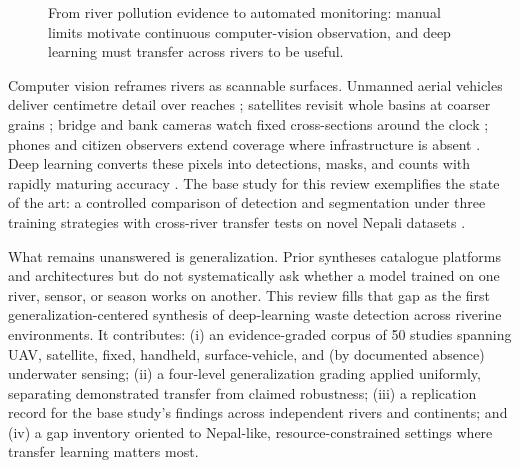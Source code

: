 \documentclass[12pt]{article}
\begin{document}
\begin{figure}[!t]
\centering
{}
\caption{From river pollution evidence to automated monitoring: manual limits motivate continuous computer-vision observation, and deep learning must transfer across rivers to be useful.}
\label{fig:problem}
\end{figure}

Computer vision reframes rivers as scannable surfaces. Unmanned aerial vehicles deliver centimetre detail over reaches \cite{Maharjan2022,Jakovljevic2020}; satellites revisit whole basins at coarser grains \cite{SoleGomez2022,Mohsen2023}; bridge and bank cameras watch fixed cross-sections around the clock \cite{Lieshout2020,Reinhardt2024}; phones and citizen observers extend coverage where infrastructure is absent \cite{JiaFrontiers2023,Tharani2021}. Deep learning converts these pixels into detections, masks, and counts with rapidly maturing accuracy \cite{Jia2023}. The base study for this review exemplifies the state of the art: a controlled comparison of detection and segmentation under three training strategies with cross-river transfer tests on novel Nepali datasets \cite{Pati2025}.

What remains unanswered is generalization. Prior syntheses catalogue platforms \cite{Marye2025} and architectures \cite{Jia2023} but do not systematically ask whether a model trained on one river, sensor, or season works on another. This review fills that gap as the first generalization-centered synthesis of deep-learning waste detection across riverine environments. It contributes: (i) an evidence-graded corpus of 50 studies spanning UAV, satellite, fixed, handheld, surface-vehicle, and (by documented absence) underwater sensing; (ii) a four-level generalization grading applied uniformly, separating demonstrated transfer from claimed robustness; (iii) a replication record for the base study's findings across independent rivers and continents; and (iv) a gap inventory oriented to Nepal-like, resource-constrained settings where transfer learning matters most.
\end{document}
